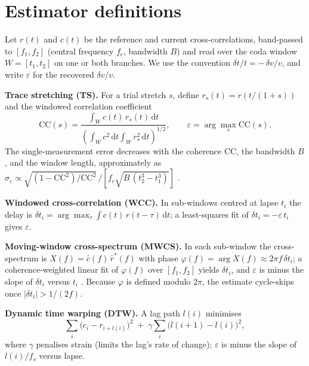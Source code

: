 \documentclass[
  referee]{gji}
\providecommand{\dvv}{\ensuremath{\delta v/v}}
\begin{document}
\appendix

\section{Estimator definitions}\label{app:estimators}

Let \(r(t)\) and \(c(t)\) be the reference and current
cross-correlations, band-passed to \([f_1,f_2]\) (central frequency
\(f_c\), bandwidth \(B\)) and read over the coda window \(W=[t_1,t_2]\)
on one or both branches. We use the convention \(\delta t/t = -\,\dvv\),
and write \(\varepsilon\) for the recovered \dvv.

\textbf{Trace stretching (TS).} For a trial stretch \(s\), define
\(r_s(t)=r\!\left(t/(1+s)\right)\) and the windowed correlation
coefficient \begin{equation}
\mathrm{CC}(s) = \frac{\int_W c(t)\,r_s(t)\,\mathrm{d}t}
{\left(\int_W c^2\,\mathrm{d}t\int_W r_s^2\,\mathrm{d}t\right)^{1/2}},
\qquad \varepsilon = \arg\max_s \mathrm{CC}(s).
\end{equation} The single-measurement error decreases with the coherence
\(\mathrm{CC}\), the bandwidth \(B\), and the window length,
approximately as \(\sigma_{\varepsilon} \propto
\sqrt{(1-\mathrm{CC}^2)/\mathrm{CC}^2}\, \big/\!\left[f_c\sqrt{B\,(t_2^3-t_1^3)}\right]\)
\citep{Weaver2011}.

\textbf{Windowed cross-correlation (WCC).} In sub-windows centred at
lapse \(t_i\) the delay is
\(\delta t_i=\arg\max_{\tau}\int c(t)\,r(t-\tau)\,\mathrm{d}t\); a
least-squares fit of \(\delta t_i=-\varepsilon\,t_i\) gives
\(\varepsilon\).

\textbf{Moving-window cross-spectrum (MWCS).} In each sub-window the
cross-spectrum is \(X(f)=\hat c(f)\,\hat r^{*}(f)\) with phase
\(\varphi(f)=\arg X(f)\approx 2\pi
f\,\delta t_i\); a coherence-weighted linear fit of \(\varphi(f)\) over
\([f_1,f_2]\) yields \(\delta t_i\), and \(\varepsilon\) is minus the
slope of \(\delta t_i\) versus \(t_i\) \citep{Clarke2011}. Because
\(\varphi\) is defined modulo \(2\pi\), the estimate cycle-skips once
\(|\delta t_i|>1/(2f)\).

\textbf{Dynamic time warping (DTW).} A lag path \(l(i)\) minimises
\begin{equation}
\sum_i \big(c_i - r_{i+l(i)}\big)^2 \;+\; \gamma\sum_i \big(l(i{+}1)-l(i)\big)^2,
\end{equation} where \(\gamma\) penalises strain (limits the lag's rate
of change); \(\varepsilon\) is minus the slope of \(l(i)/f_s\) versus
lapse.
\end{document}

